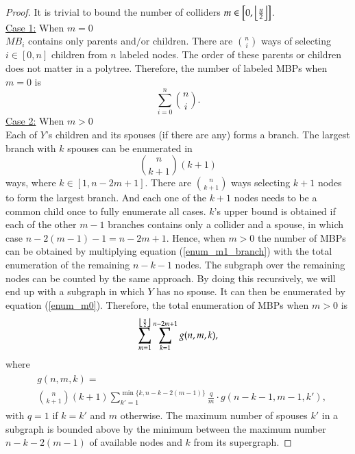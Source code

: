 \documentclass{svmult}
\begin{document}
\begin{proof}
It is trivial to bound the number of colliders $m \in \left[0, \floor*{\frac{n}{2}}\right]$. \\
\underline{Case 1:} When $m=0$\\
$MB_i$ contains only parents and$/$or children. There are $\binom{n}{i}$ ways of selecting $i \in [0, n]$ children from $n$ labeled nodes. The order of these parents or children does not matter in a polytree. Therefore, the number of labeled MBPs when $m=0$ is 
\begin{equation}
\label{enum_m0} 
\sum_{i=0}^n \binom{n}{i}.
\end{equation}
\underline{Case 2:} When $m > 0$\\
Each of $Y$'s children and its spouses (if there are any) forms a branch. The largest branch with $k$ spouses can be enumerated in 
\begin{equation}
\label{enum_m1_branch}
\binom{n}{k+1}(k+1)
\end{equation}  
ways, where $k \in [1, n-2m+1]$. There are ${n \choose k + 1}$ ways
selecting $k+1$ nodes to form the largest branch. And each one of the
$k+1$ nodes needs to be a common child once to fully enumerate all
cases. $k$'s upper bound is obtained if each of the other $m-1$
branches contains only a collider and a spouse, in which case
$n - 2(m-1) -1 = n-2m+1$. Hence, when $m > 0$ the number of MBPs can
be obtained by multiplying equation (\ref{enum_m1_branch}) with the
total enumeration of the remaining $n-k-1$ nodes. The subgraph over
the remaining nodes can be counted by the same approach. By doing this
recursively, we will end up with a subgraph in which $Y$ has no
spouse. It can then be enumerated by equation
(\ref{enum_m0}). Therefore, the total enumeration of MBPs when $m > 0$
is
\begin{equation}
\label{enum_m1}
\sum_{m=1}^{\floor*{\frac{n}{2}}} \sum_{k=1}^{n-2m+1} g(n,m,k), 
\end{equation}
where
\begin{align}
\label{enum_gnmk}
\begin{split}
&g(n,m,k) = \\ 
&\binom{n}{k+1}(k+1) \sum_{k'=1}^{\min\{k, n-k-2(m-1)\}}\frac{q}{m} \cdot g(n-k-1,m-1,k'),
\end{split}
\end{align}
with $q=1$ if $k=k'$ and $m$ otherwise. The maximum number of spouses
$k'$ in a subgraph is bounded above by the minimum between the maximum
number $n-k-2(m-1)$ of available nodes and $k$ from its supergraph.


\end{proof}
\end{document}
